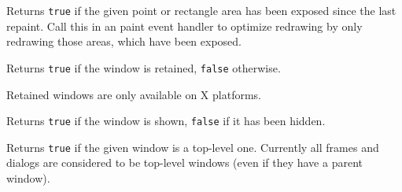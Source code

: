 

\label{wxwindowisexposed}





Returns {\tt true} if the given point or rectangle area has been exposed since the
last repaint. Call this in an paint event handler to optimize redrawing by
only redrawing those areas, which have been exposed.



\label{wxwindowisretained}


Returns {\tt true} if the window is retained, {\tt false} otherwise.


Retained windows are only available on X platforms.


\label{wxwindowisshown}


Returns {\tt true} if the window is shown, {\tt false} if it has been hidden.


\label{wxwindowistoplevel}


Returns {\tt true} if the given window is a top-level one. Currently all frames and
dialogs are considered to be top-level windows (even if they have a parent
window).


\label{wxwindowlayout}


